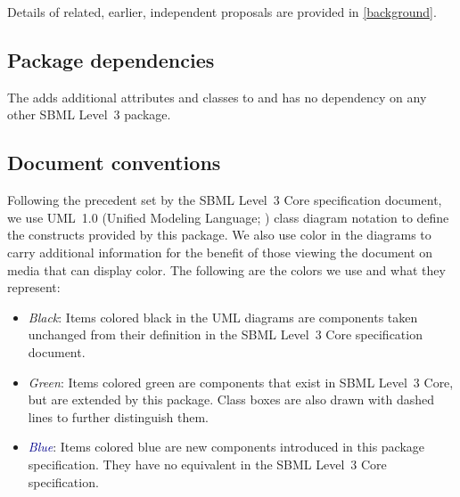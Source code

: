 Details of related, earlier, independent proposals are provided in \ref{background}.

\subsection{Package dependencies}

The \FBCPackage adds additional attributes and classes to \sbmlthreecore and has no dependency on any other SBML Level~3 package.


\subsection{Document conventions} \label{conventions}

Following the precedent set by the SBML Level~3 Core specification
document, we use UML~1.0 (Unified Modeling Language;
\citealt{eriksson:1998,oestereich:1999}) class diagram notation to
define the constructs provided by this package. We also use color in the
diagrams to carry additional information for the benefit of those
viewing the document on media that can display color. The following are
the colors we use and what they represent:

\begin{itemize}

\item[\raisebox{2.75pt}{\colorbox{black}{\rule{0.8pt}{0.8pt}}}]
\emph{Black}: Items colored black in the UML diagrams are components
taken unchanged from their definition in the SBML Level~3 Core
specification document.

\item[\raisebox{2.75pt}{\colorbox{mediumgreen}{\rule{0.8pt}{0.8pt}}}]
\emph{\textcolor{mediumgreen}{Green}}: Items colored green are
components that exist in SBML Level~3 Core, but are extended by this
package. Class boxes are also drawn with dashed lines to further
distinguish them.

\item[\raisebox{2.75pt}{\colorbox{darkblue}{\rule{0.8pt}{0.8pt}}}]
\emph{\textcolor{darkblue}{Blue}}: Items colored blue are new components
introduced in this package specification. They have no equivalent in the
SBML Level~3 Core specification.


\end{itemize}


